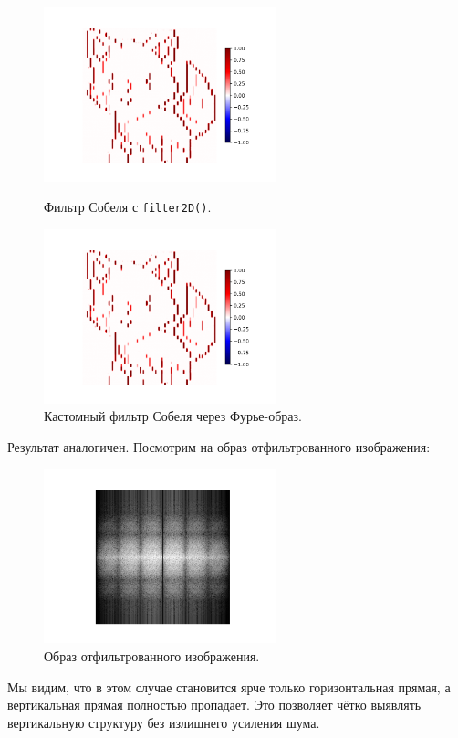 \documentclass[a4paper]{article}
\begin{document}
\begin{figure}[H]
  \centering
  \includegraphics[width=0.6\textwidth]{src/custom.png}
  \caption{Фильтр Собеля с \texttt{filter2D()}.}
  \includegraphics[width=0.6\textwidth]{src/ifft_custom.png}
  \caption{Кастомный фильтр Собеля через Фурье-образ.}
\end{figure}
\noindent Результат аналогичен. Посмотрим на образ отфильтрованного изображения:
\begin{figure}[H]
  \centering
  \includegraphics[width=0.6\textwidth]{src/ifft_spec_custom.png}
  \caption{Образ отфильтрованного изображения.}
\end{figure}
\noindent Мы видим, что в этом случае становится ярче только горизонтальная прямая, а вертикальная прямая полностью пропадает. Это позволяет чётко выявлять вертикальную структуру без излишнего усиления шума. 
\end{document}
